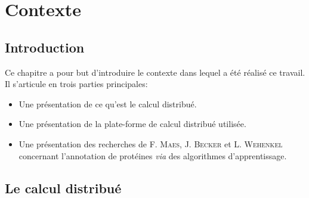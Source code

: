 \documentclass[a4paper, 11pt]{report}
\begin{document}

\chapter{Contexte}

\section{Introduction}
Ce chapitre a pour but d'introduire le contexte dans lequel a été réalisé ce travail. Il s'articule en trois parties principales:
\begin{itemize}
\item Une présentation de ce qu'est le calcul distribué.
\item Une présentation de la plate-forme de calcul distribué utilisée.
\item Une présentation des recherches de F. \textsc{Maes}, J. \textsc{Becker} et L. \textsc{Wehenkel} concernant l'annotation de protéines \textit{via} des algorithmes d'apprentissage.
\end{itemize}

\section{Le calcul distribué}
\end{document}
